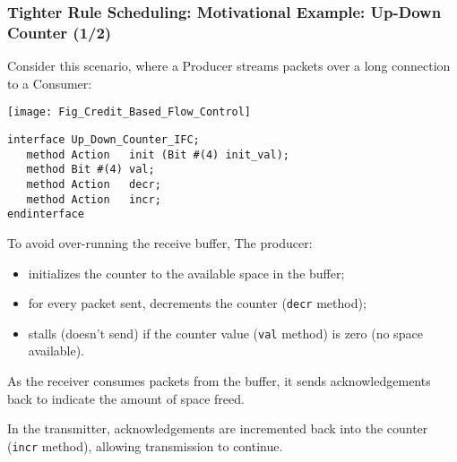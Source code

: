 \begin{frame}[fragile]
\frametitle{Tighter Rule Scheduling: Motivational Example: Up-Down Counter (1/2)}

\footnotesize

Consider this scenario, where a Producer streams packets over a long
connection to a Consumer:

\begin{center}
 \texttt{[image: Fig\_Credit\_Based\_Flow\_Control]}
\end{center}

\begin{minipage}{0.38\textwidth}\scriptsize
\begin{Verbatim}[frame=single]
interface Up_Down_Counter_IFC;
   method Action   init (Bit #(4) init_val);
   method Bit #(4) val;
   method Action   decr;
   method Action   incr;
endinterface
\end{Verbatim}
\end{minipage}
\begin{minipage}{0.6\textwidth}

To avoid over-running the receive buffer,   The producer:

\begin{itemize}
 \item initializes the counter to the available space in the buffer;
 \item for every packet sent, decrements the counter  ({\tt decr} method);
 \item stalls (doesn't send) if the counter value ({\tt val} method) is zero (no space available).
\end{itemize}

As the receiver consumes packets from the buffer, it sends
acknowledgements back to indicate the amount of space freed.

\vspace{1ex}

In the transmitter, acknowledgements are incremented back into the
counter ({\tt incr} method), allowing transmission to continue.
\end{minipage}

\end{frame}


